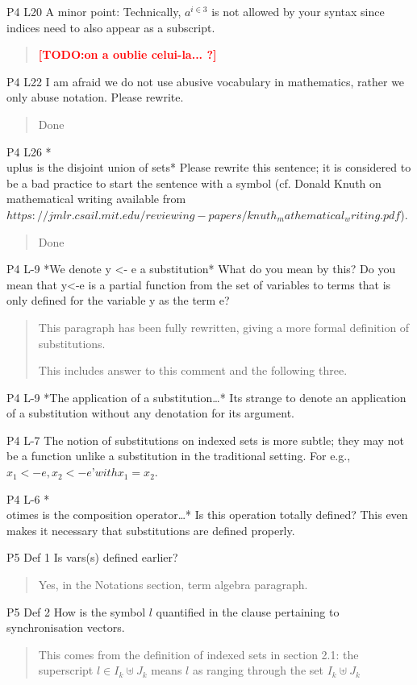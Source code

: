 \documentclass{article}
\newcommand{\TODO}[1]{\textcolor{red}{\textbf{[TODO:#1]}}}
\begin{document}
P4 L20 A minor point: Technically, $a^{i\in 3}$ is not allowed by your syntax since indices need to also appear as a subscript.
\begin{quote}
\TODO{on a oublie celui-la... ?}
\end{quote}

P4 L22 I am afraid we do not use abusive vocabulary in mathematics, rather we only abuse notation. Please rewrite.
\begin{quote}
Done
\end{quote}

P4 L26 *\\uplus is the disjoint union of sets* Please rewrite this sentence; it is considered to be a bad practice to start the sentence with a symbol (cf. Donald Knuth on mathematical writing available from $https://jmlr.csail.mit.edu/reviewing-papers/knuth_mathematical_writing.pdf$).
\begin{quote}
Done
\end{quote}


P4 L-9 *We denote y <- e a substitution* What do you mean by this? Do you mean that y<-e is a partial function from the set of variables to terms that is only defined for the variable y as the term e?
\begin{quote}
This paragraph has been fully rewritten, giving a more formal definition of substitutions.

This includes answer to this comment and the following three. 
\end{quote}


P4 L-9 *The application of a substitution…* Its strange to denote an application of a substitution without any denotation for its argument.

P4 L-7 The notion of substitutions on indexed sets is more subtle; they may not be a function unlike a substitution in the traditional setting. For e.g., $x_1 <-e, x_2 <-e’ with x_1 = x_2$.

P4 L-6 *\\otimes is the composition operator…* Is this operation totally defined? This even makes it necessary that substitutions are defined properly.

P5 Def 1 Is vars(s) defined earlier?
\begin{quote}
Yes, in the Notations section, term algebra paragraph.
\end{quote}

P5 Def 2 How is the symbol $l$ quantified in the clause pertaining to synchronisation vectors.
\begin{quote}
This comes from the definition of indexed sets in section 2.1: the superscript $l\in I_k\uplus J_k$ means $l$ as ranging through the set $I_k\uplus J_k$
\end{quote}
\end{document}
